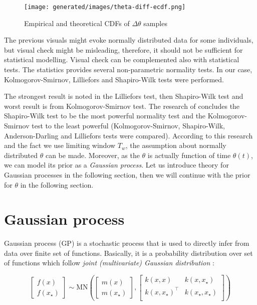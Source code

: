 \documentclass[
  digital, %
  oneside, %
  lof,     %
  lot,     %
]{fithesis4}
\begin{document}
\begin{figure}[H]
  \begin{center}
    \texttt{[image: generated/images/theta-diff-ecdf.png]}
  \end{center}
  \caption{Empirical and theoretical CDFs of $\Delta \theta$ samples}
  \label{fig:theta-diff-ecdf}
\end{figure}

The previous visuals might evoke normally 
distributed data for some individuals, but 
visual check might be misleading, therefore, 
it should not be sufficient for statistical 
modelling. Visual check can be complemented 
also with statistical tests. The 
statistics provides several non-parametric 
normality tests.
In our case, Kolmogorov-Smirnov, Lilliefors and 
Shapiro-Wilk tests were performed.





The strongest result is noted in the 
Lilliefors test, then Shapiro-Wilk test and 
worst result is from Kolmogorov-Smirnov test.
The research of \cite{razali2011} concludes the 
Shapiro-Wilk test to be the most powerful 
normality test and the Kolmogorov-Smirnov test 
to the least powerful (Kolmogorov-Smirnov, 
Shapiro-Wilk, Anderson-Darling and Lilliefors 
tests were compared). 
According to this research and the fact we 
use limiting window $T_w$, the 
assumption about normally distributed $\theta$ 
can be made.
Moreover, as the $\theta$ is actually function of time $\theta(t)$,
we can model its prior as a \textit{Gaussian process}.
Let us introduce theory for Gaussian processes in the
following section, then we will continue
with the prior for $\theta$ in the following section.


\section{Gaussian process}

Gaussian process (GP) is a stochastic process that is used to directly infer
from data over finite set of functions.
Basically, it is a probability distribution over set of
functions which follow \textit{joint (multivariate) Gaussian
distribution} \cite{frigola2015}:

\begin{equation}
    \begin{bmatrix}
      f(x) \\ f(x_\star)
    \end{bmatrix} \sim \text{MN}\left(
    \begin{bmatrix}
      m(x) \\ m(x_\star)
    \end{bmatrix},
    \begin{bmatrix}
      k(x, x) & k(x, x_\star) \\ 
      k(x, x_\star)^\top & k(x_\star, x_\star) \\ 
    \end{bmatrix}
  \right)
\end{equation}
\end{document}
